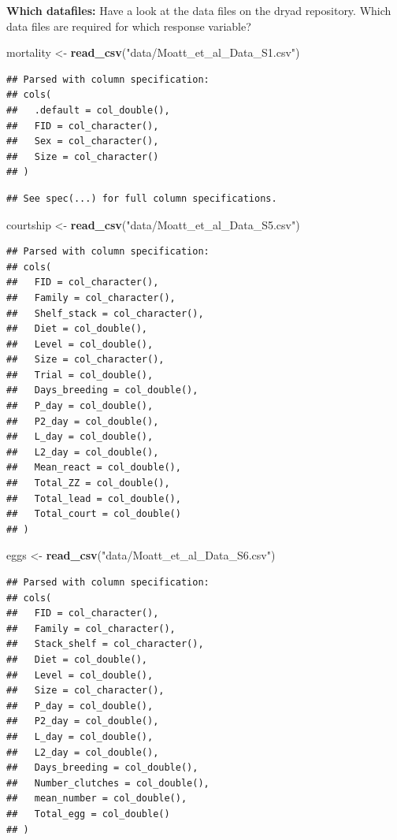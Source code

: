 \documentclass[]{book}
\newenvironment{Shaded}{\begin{snugshade}}{\end{snugshade}}
\newcommand{\KeywordTok}[1]{\textcolor[rgb]{0.13,0.29,0.53}{\textbf{#1}}}
\newcommand{\NormalTok}[1]{#1}
\newcommand{\StringTok}[1]{\textcolor[rgb]{0.31,0.60,0.02}{#1}}
\begin{document}
\textbf{Which datafiles:} Have a look at the data files on the dryad repository. Which data files are required for which response variable?

\begin{Shaded}
\begin{Highlighting}[]
\NormalTok{mortality <-}\StringTok{ }\KeywordTok{read_csv}\NormalTok{(}\StringTok{"data/Moatt_et_al_Data_S1.csv"}\NormalTok{)}
\end{Highlighting}
\end{Shaded}

\begin{verbatim}
## Parsed with column specification:
## cols(
##   .default = col_double(),
##   FID = col_character(),
##   Sex = col_character(),
##   Size = col_character()
## )
\end{verbatim}

\begin{verbatim}
## See spec(...) for full column specifications.
\end{verbatim}

\begin{Shaded}
\begin{Highlighting}[]
\NormalTok{courtship <-}\StringTok{ }\KeywordTok{read_csv}\NormalTok{(}\StringTok{"data/Moatt_et_al_Data_S5.csv"}\NormalTok{)}
\end{Highlighting}
\end{Shaded}

\begin{verbatim}
## Parsed with column specification:
## cols(
##   FID = col_character(),
##   Family = col_character(),
##   Shelf_stack = col_character(),
##   Diet = col_double(),
##   Level = col_double(),
##   Size = col_character(),
##   Trial = col_double(),
##   Days_breeding = col_double(),
##   P_day = col_double(),
##   P2_day = col_double(),
##   L_day = col_double(),
##   L2_day = col_double(),
##   Mean_react = col_double(),
##   Total_ZZ = col_double(),
##   Total_lead = col_double(),
##   Total_court = col_double()
## )
\end{verbatim}

\begin{Shaded}
\begin{Highlighting}[]
\NormalTok{eggs <-}\StringTok{ }\KeywordTok{read_csv}\NormalTok{(}\StringTok{"data/Moatt_et_al_Data_S6.csv"}\NormalTok{)}
\end{Highlighting}
\end{Shaded}

\begin{verbatim}
## Parsed with column specification:
## cols(
##   FID = col_character(),
##   Family = col_character(),
##   Stack_shelf = col_character(),
##   Diet = col_double(),
##   Level = col_double(),
##   Size = col_character(),
##   P_day = col_double(),
##   P2_day = col_double(),
##   L_day = col_double(),
##   L2_day = col_double(),
##   Days_breeding = col_double(),
##   Number_clutches = col_double(),
##   mean_number = col_double(),
##   Total_egg = col_double()
## )
\end{verbatim}
\end{document}
